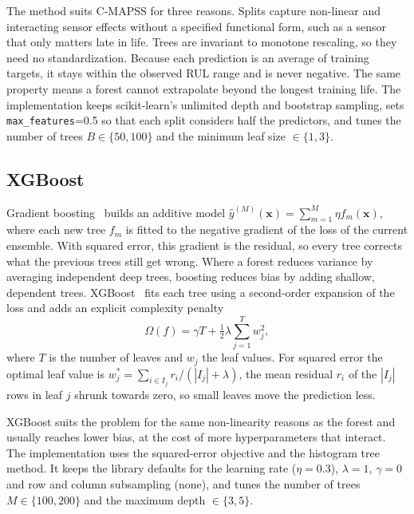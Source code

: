 The method suits C-MAPSS for three reasons. Splits capture non-linear and
interacting sensor effects without a specified functional form, such as a
sensor that only matters late in life. Trees are invariant to monotone
rescaling, so they need no standardization. Because each prediction is an
average of training targets, it stays within the observed RUL range and is
never negative. The same property means a forest cannot extrapolate beyond the
longest training life. The implementation keeps scikit-learn's unlimited depth
and bootstrap sampling, sets \texttt{max\_features}=0.5 so that each split
considers half the predictors, and tunes the number of trees
$B\in\{50,100\}$ and the minimum leaf size $\in\{1,3\}$.

\subsection{XGBoost}
Gradient boosting~\cite{Friedman2001greedy} builds an additive model
$\hat{y}^{(M)}(\mathbf{x})=\sum_{m=1}^{M}\eta f_m(\mathbf{x})$, where each new
tree $f_m$ is fitted to the negative gradient of the loss of the current
ensemble. With squared error, this gradient is the residual, so every tree
corrects what the previous trees still get wrong. Where a forest reduces
variance by averaging independent deep trees, boosting reduces bias by adding
shallow, dependent trees. XGBoost~\cite{Chen2016xgboost} fits each tree using a
second-order expansion of the loss and adds an explicit complexity penalty
\begin{equation}
    \Omega(f)=\gamma T+\tfrac{1}{2}\lambda\sum_{j=1}^{T}w_j^2 ,
\end{equation}
where $T$ is the number of leaves and $w_j$ the leaf values. For squared error
the optimal leaf value is $w_j^\ast=\sum_{i\in I_j}r_i/(|I_j|+\lambda)$, the mean
residual $r_i$ of the $|I_j|$ rows in leaf $j$ shrunk towards zero, so small
leaves move the prediction less.

XGBoost suits the problem for the same non-linearity reasons as the forest and
usually reaches lower bias, at the cost of more hyperparameters that interact.
The implementation uses the squared-error objective and the histogram tree
method. It keeps the library defaults for the learning rate ($\eta=0.3$),
$\lambda=1$, $\gamma=0$ and row and column subsampling (none), and tunes the
number of trees $M\in\{100,200\}$ and the maximum depth $\in\{3,5\}$.

